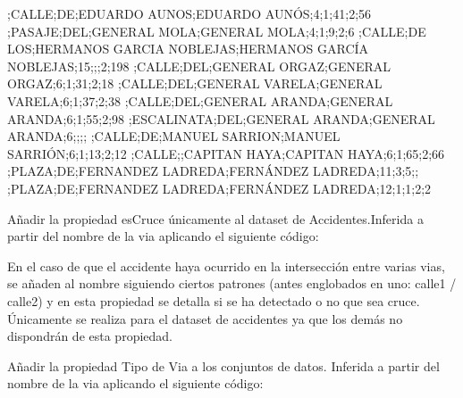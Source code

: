 \begin{tiny}
;CALLE;DE;EDUARDO AUNOS;EDUARDO AUNÓS;4;1;41;2;56
;PASAJE;DEL;GENERAL MOLA;GENERAL MOLA;4;1;9;2;6
;CALLE;DE LOS;HERMANOS GARCIA NOBLEJAS;HERMANOS GARCÍA NOBLEJAS;15;;;2;198
;CALLE;DEL;GENERAL ORGAZ;GENERAL ORGAZ;6;1;31;2;18
;CALLE;DEL;GENERAL VARELA;GENERAL VARELA;6;1;37;2;38
;CALLE;DEL;GENERAL ARANDA;GENERAL ARANDA;6;1;55;2;98
;ESCALINATA;DEL;GENERAL ARANDA;GENERAL ARANDA;6;;;;
;CALLE;DE;MANUEL SARRION;MANUEL SARRIÓN;6;1;13;2;12
;CALLE;;CAPITAN HAYA;CAPITAN HAYA;6;1;65;2;66
;PLAZA;DE;FERNANDEZ LADREDA;FERNÁNDEZ LADREDA;11;3;5;;
;PLAZA;DE;FERNANDEZ LADREDA;FERNÁNDEZ LADREDA;12;1;1;2;2
\end{tiny}










   \item Añadir la propiedad esCruce únicamente al dataset de Accidentes.Inferida a partir del nombre de la via aplicando el siguiente código:
   
   

En el caso de que el accidente haya ocurrido en la intersección entre varias vias, se añaden al nombre siguiendo ciertos patrones (antes englobados en uno: calle1 / calle2) y en esta propiedad se detalla si se ha detectado o no que sea cruce.
\newline
Únicamente se realiza para el dataset de accidentes ya que los demás no dispondrán de esta propiedad.
\newline


    \item Añadir la propiedad Tipo de Via a los conjuntos de datos. Inferida a partir del nombre de la via aplicando el siguiente código:
    
       
      
